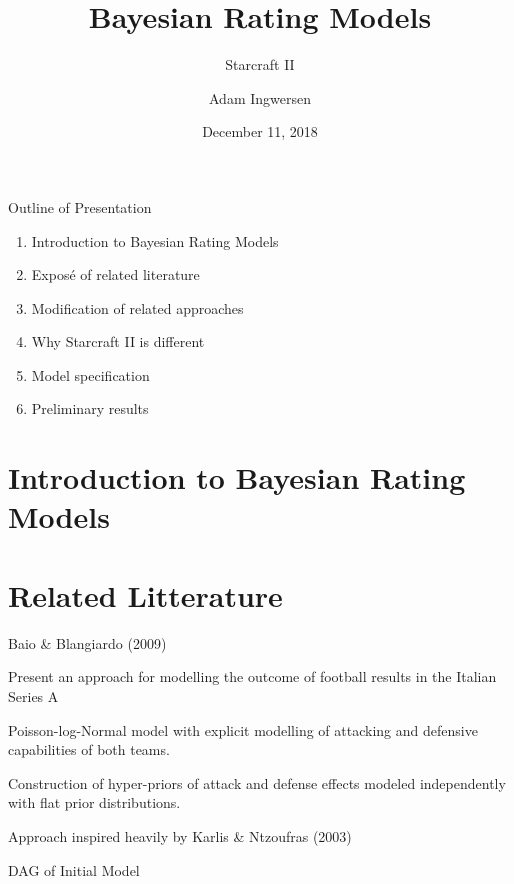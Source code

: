 \documentclass[ignorenonframetext,]{beamer}
\title{Bayesian Rating Models}
\subtitle{Starcraft II}
\author{Adam Ingwersen}
\date{December 11, 2018}
\providecommand{\tightlist}{%
  \setlength{\itemsep}{0pt}\setlength{\parskip}{0pt}}
\begin{document}
\frame{\titlepage}

\begin{frame}{Outline of Presentation}

\begin{enumerate}
\def\labelenumi{\arabic{enumi}.}
\tightlist
\item
  Introduction to Bayesian Rating Models
\item
  Exposé of related literature
\item
  Modification of related approaches
\item
  Why Starcraft II is different
\item
  Model specification
\item
  Preliminary results
\end{enumerate}

\end{frame}

\section{Introduction to Bayesian Rating
Models}\label{introduction-to-bayesian-rating-models}

\section{Related Litterature}\label{related-litterature}

\begin{frame}{Baio \& Blangiardo (2009)}

Present an approach for modelling the outcome of football results in the
Italian Series A

Poisson-log-Normal model with explicit modelling of attacking and
defensive capabilities of both teams.

Construction of hyper-priors of attack and defense effects modeled
independently with flat prior distributions.

Approach inspired heavily by Karlis \& Ntzoufras (2003)

\end{frame}

\begin{frame}{DAG of Initial Model}

\begin{frame}[fragile]
\end{frame}

\end{frame}
\end{document}
